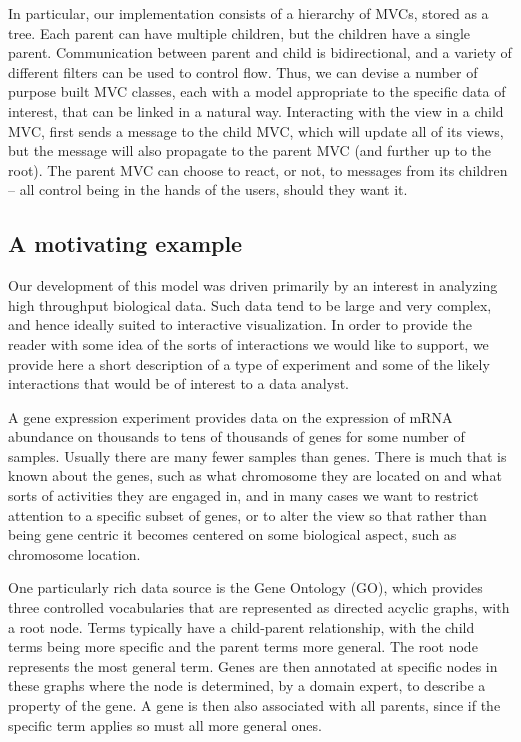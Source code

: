 \documentclass[11pt]{article}
\begin{document}
In particular, our implementation consists of a hierarchy of MVCs,
stored as a tree.  Each parent can have multiple children, but the
children have a single parent.  Communication between parent and
child is bidirectional, and a variety of different filters can be used
to control flow.  Thus, we can devise a number of purpose built MVC
classes, each with a model appropriate to the specific data of
interest, that can be linked in a natural way.  Interacting with the view
in a child MVC, first sends a message to the child MVC, which will
update all of its views, but the message will also propagate to the
parent MVC (and further up to the root). The parent MVC can choose to
react, or not, to messages from its children -- all control being in
the hands of the users, should they want it.

\subsection*{A motivating example}
\label{sec:micro}

Our development of this model was driven primarily by an interest in
analyzing high throughput biological data.  Such data tend to be large
and very complex, and hence ideally suited to interactive
visualization.  In order to provide the reader with some idea of the
sorts of interactions we would like to support, we provide here a short
description of a type of experiment and some of the likely
interactions that would be of interest to a data analyst.

A gene expression experiment provides data on the expression of mRNA
abundance on thousands to tens of thousands of genes for some number
of samples. Usually there are many fewer samples than genes. There is
much that is known about the genes, such as what chromosome they are
located on and what sorts of activities they are engaged in, and in many
cases we want to restrict attention to a specific subset of genes, or
to alter the view so that rather than being gene centric it becomes
centered on some biological aspect, such as chromosome location.

One particularly rich data source is the Gene Ontology (GO), \cite{GO}
which provides three controlled vocabularies that are represented as
directed acyclic graphs, with a root node. Terms typically have a
child-parent relationship, with the child terms being more specific
and the parent terms more general. The root node represents the most
general term. Genes are then annotated at specific nodes in these
graphs where the node is determined, by a domain expert, to describe a
property of the gene. A gene is then also associated with all parents,
since if the specific term applies so must all more general ones.
\end{document}

